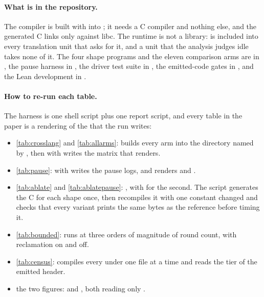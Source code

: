\label{sec:artifact}

\paragraph{What is in the repository.}
The compiler is built with  into ; it needs a C compiler and nothing
else, and the generated C links only against libc.  The runtime is not a library: 
is included into every translation unit that asks for it, and a unit that the analysis judges idle
takes none of it.  The four shape programs and the eleven comparison arms are in
, the pause harness in , the driver test suite in
, the emitted-code gates in , and the Lean development in
.

\paragraph{How to re-run each table.}
The harness is one shell script plus one report script, and every table in the paper is a rendering
of the  that the run writes:
\begin{itemize}
\item \tab\ref{tab:crosslang} and \tab\ref{tab:allarms}:  builds every arm
into the directory named by , then  with  writes the matrix
that  renders.
\item \tab\ref{tab:pause}:  with  writes the pause logs, and
 renders  and .
\item \tab\ref{tab:ablate} and \tab\ref{tab:ablatepause}: , with
 for the second.  The script generates the C for each shape once, then recompiles it
with one  constant changed and checks that every variant prints the same bytes as the
reference before timing it.
\item \tab\ref{tab:bounded}:  runs  at three orders of
magnitude of round count, with reclamation on and off.
\item \tab\ref{tab:census}:  compiles every  under  one
file at a time and reads the tier of the emitted header.
\item the two figures:  and , both reading only
.
\end{itemize}


